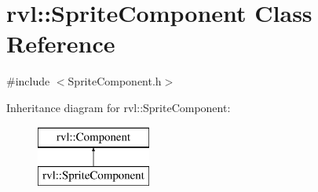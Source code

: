 \hypertarget{classrvl_1_1_sprite_component}{}\section{rvl\+:\+:Sprite\+Component Class Reference}
\label{classrvl_1_1_sprite_component}


{\ttfamily \#include $<$Sprite\+Component.\+h$>$}

Inheritance diagram for rvl\+:\+:Sprite\+Component\+:\begin{figure}[H]
\begin{center}
\leavevmode
\includegraphics[height=2.000000cm]{classrvl_1_1_sprite_component}
\end{center}
\end{figure}
